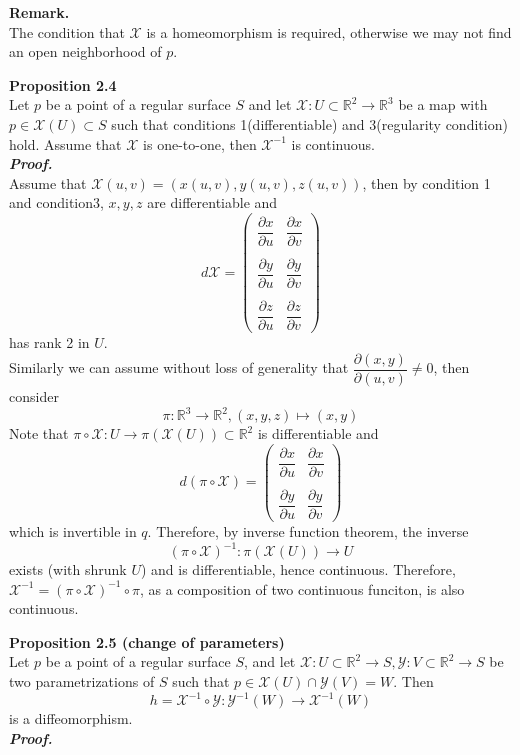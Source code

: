 \documentclass{article}
\begin{document}
\par
\textbf{Remark.}\\
The condition that $\mathcal{X}$ is a homeomorphism is required, otherwise we may not find an open neighborhood of $p$.

\par
\textbf{Proposition 2.4}\\
Let $p$ be a point of a regular surface $S$ and let $\mathcal{X}: U \subset \mathbb{R}^2 \to \mathbb{R}^3$ be a map with $p \in \mathcal{X}(U) \subset S$
such that conditions 1(differentiable) and 3(regularity condition) hold. Assume that $\mathcal{X}$ is one-to-one, then $\mathcal{X}^{-1}$ is continuous.\\
\textbf{\textit{Proof.}}\\
Assume that $\mathcal{X}(u,v)=(x(u,v),y(u,v),z(u,v))$, then by condition 1 and condition3, $x, y, z$ are differentiable and
$$
    d\mathcal{X} = 
    \left(
        \begin{array}{cc}
            \dfrac{\partial x}{\partial u} & \dfrac{\partial x}{\partial v}\\\\
            \dfrac{\partial y}{\partial u} & \dfrac{\partial y}{\partial v}\\\\
            \dfrac{\partial z}{\partial u} & \dfrac{\partial z}{\partial v}
        \end{array}
    \right)
$$
has rank 2 in $U$.\\
Similarly we can assume without loss of generality that $\dfrac{\partial(x,y)}{\partial(u,v)} \neq 0$, then consider 
$$
    \pi: \mathbb{R}^3 \to \mathbb{R}^2, (x,y,z) \mapsto (x,y)
$$
Note that $\pi \circ \mathcal{X}: U \to \pi(\mathcal{X}(U)) \subset \mathbb{R}^2$ is differentiable and
$$
    d(\pi \circ \mathcal{X}) = 
    \left(
        \begin{array}{cc}
            \dfrac{\partial x}{\partial u} & \dfrac{\partial x}{\partial v}\\\\
            \dfrac{\partial y}{\partial u} & \dfrac{\partial y}{\partial v}
        \end{array}
    \right)
$$
which is invertible in $q$. Therefore, by inverse function theorem, the inverse
$$
    (\pi \circ \mathcal{X})^{-1}: \pi(\mathcal{X}(U)) \to U
$$
exists (with shrunk $U$) and is differentiable, hence continuous.
Therefore, $\mathcal{X}^{-1} = (\pi \circ \mathcal{X})^{-1} \circ \pi$, as a composition of two
continuous funciton, is also continuous. \qedsymbol

\par
\textbf{Proposition 2.5 (change of parameters)}\\
Let $p$ be a point of a regular surface $S$, and let $\mathcal{X}: U \subset \mathbb{R}^2 \to S, \mathcal{Y}: V \subset \mathbb{R}^2 \to S$
be two parametrizations of $S$ such that $p \in \mathcal{X}(U) \cap \mathcal{Y}(V) = W$. Then
$$
    h = \mathcal{X}^{-1} \circ \mathcal{Y}: \mathcal{Y}^{-1}(W) \to \mathcal{X}^{-1}(W)
$$
is a diffeomorphism.\\
\textbf{\textit{Proof.}}\\
\end{document}
